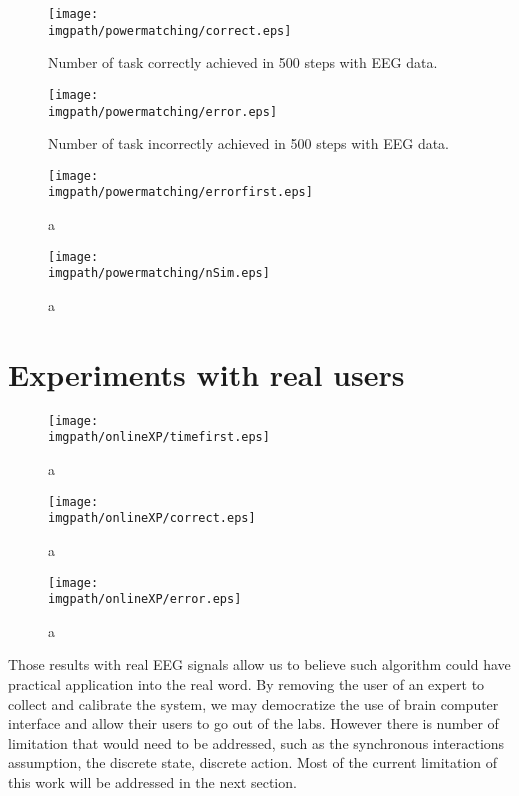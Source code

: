 \begin{figure}[!ht]
\centering
\texttt{[image: \\imgpath/powermatching/correct.eps]}
\caption{Number of task correctly achieved in 500 steps with EEG data.}
\label{fig:nCorrect_powermatching}
\end{figure} 

\begin{figure}[!ht]
\centering
\texttt{[image: \\imgpath/powermatching/error.eps]}
\caption{Number of task incorrectly achieved in 500 steps with EEG data.}
\label{fig:nWrongEEG_powermatching}
\end{figure} 


\begin{figure}[!ht]
\centering
\texttt{[image: \\imgpath/powermatching/errorfirst.eps]}
\caption{a}
\label{fig:errorfirst_powermatching}
\end{figure} 


\begin{figure}[!ht]
\centering
\texttt{[image: \\imgpath/powermatching/nSim.eps]}
\caption{a}
\label{fig:nSim_powermatching}
\end{figure} 


\section{Experiments with real users}

\begin{figure}[!ht]
\centering
\texttt{[image: \\imgpath/onlineXP/timefirst.eps]}
\caption{a}
\label{fig:timefirst_online}
\end{figure} 


\begin{figure}[!ht]
\centering
\texttt{[image: \\imgpath/onlineXP/correct.eps]}
\caption{a}
\label{fig:correct_online}
\end{figure} 

\begin{figure}[!ht]
\centering
\texttt{[image: \\imgpath/onlineXP/error.eps]}
\caption{a}
\label{fig:error_online}
\end{figure} 



\transition


Those results with real EEG signals allow us to believe such algorithm could have practical application into the real word. By removing the user of an expert to collect and calibrate the system, we may democratize the use of brain computer interface and allow their users to go out of the labs. However there is number of limitation that would need to be addressed, such as the synchronous interactions assumption, the discrete state, discrete action. Most of the current limitation of this work will be addressed in the next section.

